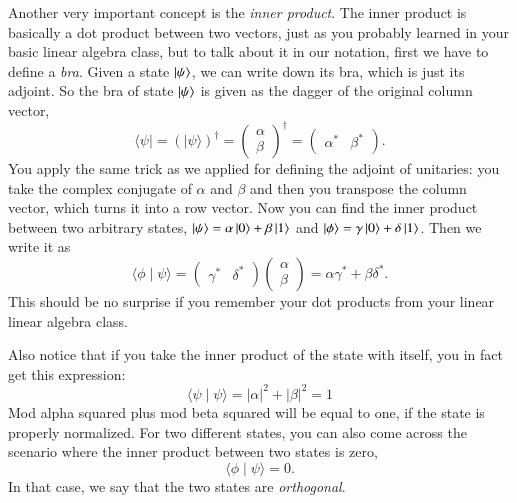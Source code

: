 Another very important concept is the \emph{inner product}. The inner product is basically a dot product between two vectors, just as you probably learned in your basic linear algebra class, but to talk about it in our notation, first we have to define a \emph{bra}. Given a state $\left| \psi \right\rangle$, we can write down its bra, which is just its adjoint. So the bra of state $\left| \psi \right\rangle$ is given as the dagger of the original column vector,
\begin{equation}
\langle\psi|=(|\psi\rangle)^{\dagger}=\left(\begin{array}{l}
\alpha \\
\beta
\end{array}\right)^{\dagger}=\left(\begin{array}{ll}
\alpha^{*} & \beta^{*}
\end{array}\right).
\end{equation}
You apply the same trick as we applied for defining the adjoint of unitaries: you take the complex conjugate of $\alpha$ and $\beta$ and then you transpose the column vector, which turns it into a row vector. Now you can find the inner product between two arbitrary states, $\left| \psi \right\rangle = \alpha\left| 0 \right\rangle + \beta\left| 1 \right\rangle$ and $\left| \phi \right\rangle = \gamma\left| 0 \right\rangle + \delta\left| 1 \right\rangle$. Then we write it as 
\begin{equation}
\langle\phi \mid \psi\rangle=\left(\begin{array}{ll}
\gamma^{*} & \delta^{*}
\end{array}\right)\left(\begin{array}{c}
\alpha \\
\beta
\end{array}\right)=\alpha \gamma^{*}+\beta \delta^{*}.
\end{equation}
This should be no surprise if you remember your dot products from your linear linear algebra class.

Also notice that if you take the inner product of the state with itself, you in fact get this expression:
\begin{equation}
\langle\psi \mid \psi\rangle=|\alpha|^{2}+|\beta|^{2}=1
\end{equation}
Mod alpha squared plus mod beta squared will be equal to one, if the state is properly normalized. For two different states, you can also come across the scenario where the inner product between two states is zero,
\begin{equation}
\langle\phi \mid \psi\rangle=0.
\end{equation}
In that case, we say that the two states are \emph{orthogonal}.

